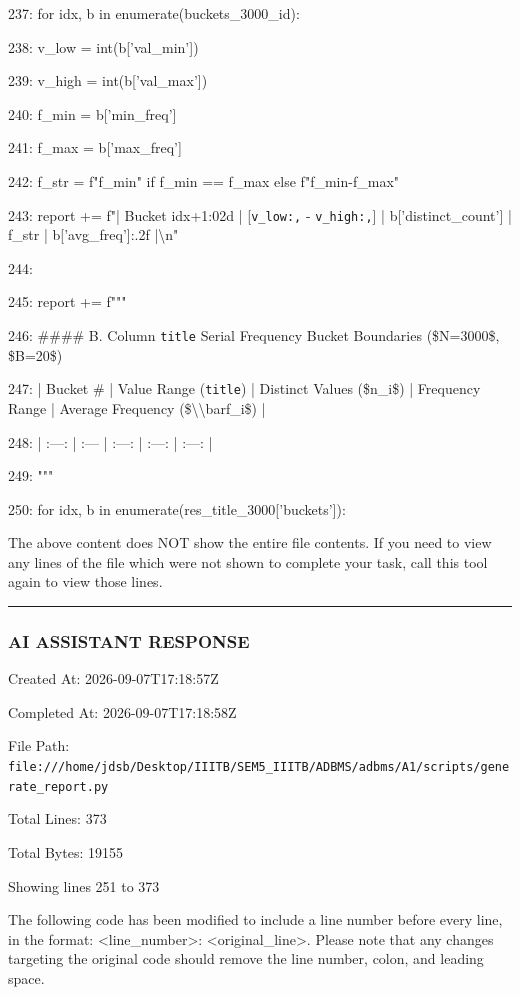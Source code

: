\documentclass[11pt,a4paper]{article}
\begin{document}
{237:     for idx, b in enumerate(buckets\_3000\_id):

238:         v\_low = int(b['val\_min'])

239:         v\_high = int(b['val\_max'])

240:         f\_min = b['min\_freq']

241:         f\_max = b['max\_freq']

242:         f\_str = f"{f\_min}" if f\_min == f\_max else f"{f\_min}-{f\_max}"

243:         report += f"| Bucket {idx+1:02d} | [\texttt{{v\_low:,}} - \texttt{{v\_high:,}}] | {b['distinct\_count']} | {f\_str} | {b['avg\_freq']:.2f} |\textbackslash{}n"

244:

245:     report += f"""

246: \#\#\#\# B. Column \texttt{title} Serial Frequency Bucket Boundaries (\$N=3000\$, \$B=20\$)

247: | Bucket \# | Value Range (\texttt{title}) | Distinct Values (\$n\_i\$) | Frequency Range | Average Frequency (\$\textbackslash{}\textbackslash{}bar{{f}}\_i\$) |

248: | :---: | :--- | :---: | :---: | :---: |

249: """

250:     for idx, b in enumerate(res\_title\_3000['buckets']):

The above content does NOT show the entire file contents. If you need to view any lines of the file which were not shown to complete your task, call this tool again to view those lines.


\hrule

\subsubsection{AI ASSISTANT RESPONSE}

Created At: 2026-09-07T17:18:57Z

Completed At: 2026-09-07T17:18:58Z

File Path: \texttt{file:///home/jdsb/Desktop/IIITB/SEM5\_IIITB/ADBMS/adbms/A1/scripts/generate\_report.py}

Total Lines: 373

Total Bytes: 19155

Showing lines 251 to 373

The following code has been modified to include a line number before every line, in the format: <line\_number>: <original\_line>. Please note that any changes targeting the original code should remove the line number, colon, and leading space.

}
\end{document}
